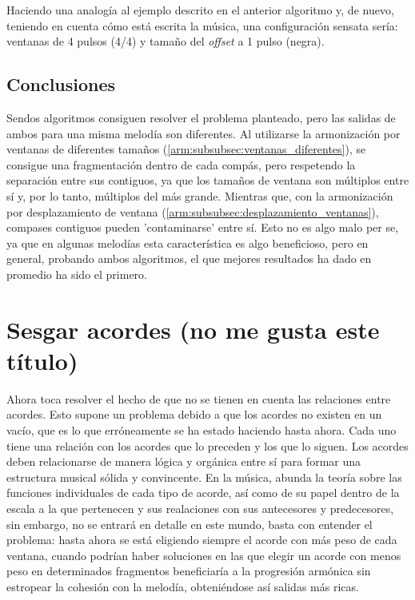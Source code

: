 Haciendo una analogía al ejemplo descrito en el anterior algoritmo y, de nuevo, teniendo en cuenta cómo está escrita la música, una configuración sensata sería: ventanas de 4 pulsos (4/4) y tamaño del \textit{offset} a 1 pulso (negra).

\subsection{Conclusiones}
    
Sendos algoritmos consiguen resolver el problema planteado, pero las salidas de ambos para una misma melodía son diferentes. Al utilizarse la armonización por ventanas de diferentes tamaños (\ref{arm:subsubsec:ventanas_diferentes}), se consigue una fragmentación dentro de cada compás, pero respetendo la separación entre sus contiguos, ya que los tamaños de ventana son múltiplos entre sí y, por lo tanto, múltiplos del más grande. Mientras que, con la armonización por desplazamiento de ventana (\ref{arm:subsubsec:desplazamiento_ventanas}), compases contiguos pueden 'contaminarse' entre sí. Esto no es algo malo per se, ya que en algunas melodías esta característica es algo beneficioso, pero en general, probando ambos algoritmos, el que mejores resultados ha dado en promedio ha sido el primero.

\section{Sesgar acordes (no me gusta este título)}

Ahora toca resolver el hecho de que no se tienen en cuenta las relaciones entre acordes. Esto supone un problema debido a que los acordes no existen en un vacío, que es lo que erróneamente se ha estado haciendo hasta ahora. Cada uno tiene una relación con los acordes que lo preceden y los que lo siguen. Los acordes deben relacionarse de manera lógica y orgánica entre sí para formar una estructura musical sólida y convincente. En la música, abunda la teoría sobre las funciones individuales de cada tipo de acorde, así como de su papel dentro de la escala a la que pertenecen y sus realaciones con sus antecesores y predecesores, sin embargo, no se entrará en detalle en este mundo, basta con entender el problema: hasta ahora se está eligiendo siempre el acorde con más peso de cada ventana, cuando podrían haber soluciones en las que elegir un acorde con menos peso en determinados fragmentos beneficiaría a la progresión armónica sin estropear la cohesión con la melodía, obteniéndose así salidas más ricas.

